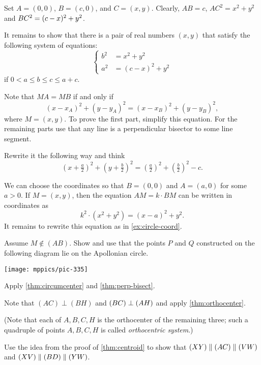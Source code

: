 \begin{multicols}{2}
Set $A=(0,0)$, $B=(c,0)$, and $C=(x,y)$.
Clearly, $AB=c$,
$AC^2=x^2+y^2$ and $BC^2\z=(c-x)^2+y^2$.

It remains to show that there is a pair of real numbers $(x,y)$ 
that satisfy the following system of equations:
$$
\left\{
\begin{aligned}
b^2&=x^2+y^2
\\
a^2&=(c-x)^2+y^2
\end{aligned}
\right.
$$
if $0<a\le b\le c\le a+c$.

 Note that $MA=MB$ if and only if
\[(x-x_A)^2+(y-y_A)^2=(x-x_B)^2+(y-y_B)^2,\]
where $M=(x,y)$. 
To prove the first part, simplify this equation.
For the remaining parts use that any line is a perpendicular bisector to some line segment.

 Rewrite it the following way and think 
\[(x+\tfrac a2)^2+(y+\tfrac b2)^2=(\tfrac a2)^2+(\tfrac b2)^2-c.\]


We can choose the coordinates so that $B=(0,0)$ and $A=(a,0)$ for some $a>0$.
If $M=(x,y)$, then the equation $AM=k\cdot BM$ can be written in coordinates as 
\[k^2\cdot(x^2+y^2)=(x-a)^2+y^2.\]
It remains to rewrite this equation as in \ref{ex:circle-coord}.

Assume $M\notin(AB)$.
Show and use that the points $P$ and $Q$ constructed on the following diagram lie on the Apollonian circle.

\begin{Figure}
\centering
\texttt{[image: mppics/pic-335]}
\end{Figure}


\setcounter{eqtn}{0}

Apply \ref{thm:circumcenter} and \ref{thm:perp-bisect}.

Note that $(AC)\perp (BH)$ and $(BC)\z\perp (AH)$ and apply \ref{thm:orthocenter}.

(Note that each of $A,B,C,H$ is the orthocenter of the remaining three; such a quadruple of points $A,B,C,H$ is called \emph{orthocentric system}.)

Use the idea from the proof of \ref{thm:centroid}
to show that $(XY)\z\parallel (AC)\z\parallel (VW)$ and
$(XV)\z\parallel (BD)\z\parallel (YW)$.


\end{multicols}
